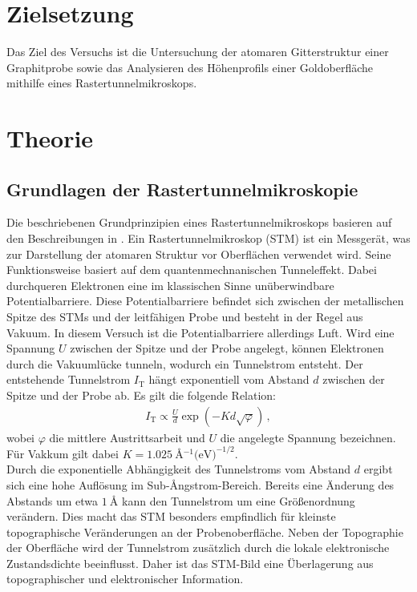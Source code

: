 \section{Zielsetzung}
\label{sec:Zielsetzung}
Das Ziel des Versuchs ist die Untersuchung der atomaren Gitterstruktur einer Graphitprobe sowie das Analysieren des Höhenprofils einer Goldoberfläche mithilfe eines Rastertunnelmikroskops.

\section{Theorie}
\label{sec:Theorie}
\subsection{Grundlagen der Rastertunnelmikroskopie}
\label{sec:GrundlagenSTM}
Die beschriebenen Grundprinzipien eines Rastertunnelmikroskops basieren auf den Beschreibungen in \cite{Surfaces}.
Ein Rastertunnelmikroskop (STM) ist ein Messgerät, was zur Darstellung der atomaren Struktur vor Oberflächen verwendet wird.
Seine Funktionsweise basiert auf dem quantenmechnanischen Tunneleffekt. 
Dabei durchqueren Elektronen eine im klassischen Sinne unüberwindbare Potentialbarriere. 
Diese Potentialbarriere befindet sich zwischen der metallischen Spitze des STMs und der leitfähigen Probe und besteht in der Regel aus Vakuum. In diesem Versuch ist die Potentialbarriere allerdings Luft.
Wird eine Spannung $U$ zwischen der Spitze und der Probe angelegt, können Elektronen durch die Vakuumlücke tunneln, wodurch ein Tunnelstrom entsteht.
Der entstehende Tunnelstrom $I_{\text{T}}$ hängt exponentiell vom Abstand $d$ zwischen der Spitze und der Probe ab. Es gilt die folgende Relation:
\begin{align}
    I_{\text{T}} \propto \frac{U}{d}\exp\left(-K d \sqrt{\varphi}\right)\,, \label{eqn:Tunnelstrom}
\end{align}
wobei $\varphi$ die mittlere Austrittsarbeit und $U$ die angelegte Spannung bezeichnen. 
Für Vakkum gilt dabei $K = \SI{1.025}{\angstrom^{-1} (\eV)^{-1/2}}$.\\

Durch die exponentielle Abhängigkeit des Tunnelstroms vom Abstand $d$ ergibt sich eine hohe Auflösung im Sub-{\AA}ngstrom-Bereich. 
Bereits eine Änderung des Abstands um etwa $\SI{1}{\angstrom}$ kann den Tunnelstrom um eine Größenordnung verändern. Dies macht das STM besonders empfindlich für kleinste topographische Veränderungen an der Probenoberfläche.
Neben der Topographie der Oberfläche wird der Tunnelstrom zusätzlich durch die lokale elektronische Zustandsdichte beeinflusst. 
Daher ist das STM-Bild eine Überlagerung aus topographischer und elektronischer Information.\\


